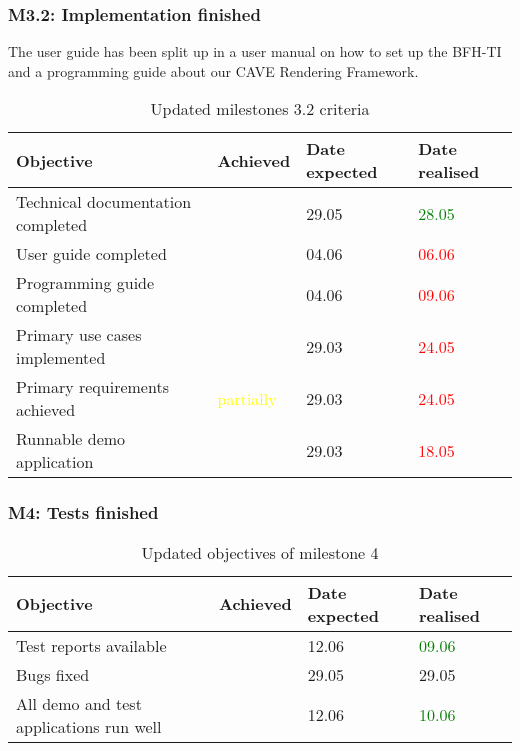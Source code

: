\subsubsection{M3.2: Implementation finished}
\label{sec:M32}

The user guide has been split up in a user manual on how to  set up the BFH-TI and a programming guide about our CAVE Rendering Framework. 

\begin{table}[H]
	\centering
	\begin{tabular}{|p{}|p{}|p{}|p{}|}
		\hline 
		\bfseries Objective & \bfseries Achieved & \bfseries Date expected  & \bfseries Date realised \\ 
		\hline
		\hline 
		Technical documentation completed	& \tick 				& 29.05	& \textcolor{green}{28.05} \\
		\hline 
		User guide completed 			& \tick 				& 04.06	& \textcolor{red}{06.06} \\
		\hline 
		Programming guide completed 		& \tick					& 04.06	& \textcolor{red}{09.06} \\
		\hline 
		Primary use cases implemented		& \tick 				& 29.03	& \textcolor{red}{24.05} \\
		\hline 
		Primary requirements achieved		& \textcolor{yellow}{partially}\footnotemark[2] & 29.03	& \textcolor{red}{24.05} \\
		\hline 
		Runnable demo application		& \tick 				& 29.03	& \textcolor{red}{18.05} \\
		\hline 
	\end{tabular}
	\caption{Updated milestones 3.2 criteria}
\end{table}

\subsubsection{M4: Tests finished}
\label{sec:M4TestsFinished}
\begin{table}[H]
	\centering
	\begin{tabular}{|p{}|p{}|p{}|p{}|}
		\hline 
		\bfseries Objective & \bfseries Achieved & \bfseries Date expected  & \bfseries Date realised \\ 
		\hline
		\hline 
		Test reports available 				& \tick & 12.06	& \textcolor{green}{09.06}	\\
		\hline 
		Bugs fixed 					& \tick & 29.05	& 29.05 \\
		\hline 
		All demo and test applications run well  	& \tick & 12.06	& \textcolor{green}{10.06}	\\
		\hline 
	\end{tabular}
	\caption{Updated objectives of milestone 4}
\end{table}

